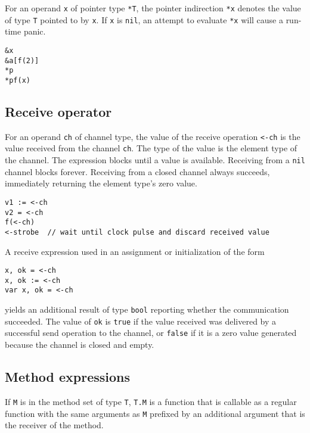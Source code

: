 {For an operand \texttt{x} of pointer type \texttt{*T}, the pointer
indirection \texttt{*x} denotes the value of type \texttt{T} pointed to
by \texttt{x}. If \texttt{x} is \texttt{nil}, an attempt to evaluate
\texttt{*x} will cause a run-time panic.

\begin{Verbatim}[frame=single]
&x
&a[f(2)]
*p
*pf(x)
\end{Verbatim}

\subsection*{Receive operator}

For an operand \texttt{ch} of channel type,
the value of the receive operation \texttt{\textless{}-ch} is the value
received from the channel \texttt{ch}. The type of the value is the
element type of the channel. The expression blocks until a value is
available. Receiving from a \texttt{nil} channel blocks forever.
Receiving from a closed channel always succeeds,
immediately returning the element type's
zero value.

\begin{Verbatim}[frame=single]
v1 := <-ch
v2 = <-ch
f(<-ch)
<-strobe  // wait until clock pulse and discard received value
\end{Verbatim}

A receive expression used in an assignment or initialization of the form

\begin{Verbatim}[frame=single]
x, ok = <-ch
x, ok := <-ch
var x, ok = <-ch
\end{Verbatim}

yields an additional result of type \texttt{bool} reporting whether the
communication succeeded. The value of \texttt{ok} is \texttt{true} if
the value received was delivered by a successful send operation to the
channel, or \texttt{false} if it is a zero value generated because the
channel is closed and empty.

\subsection*{Method expressions}

If \texttt{M} is in the method set of type
\texttt{T}, \texttt{T.M} is a function that is callable as a regular
function with the same arguments as \texttt{M} prefixed by an additional
argument that is the receiver of the method.

}
